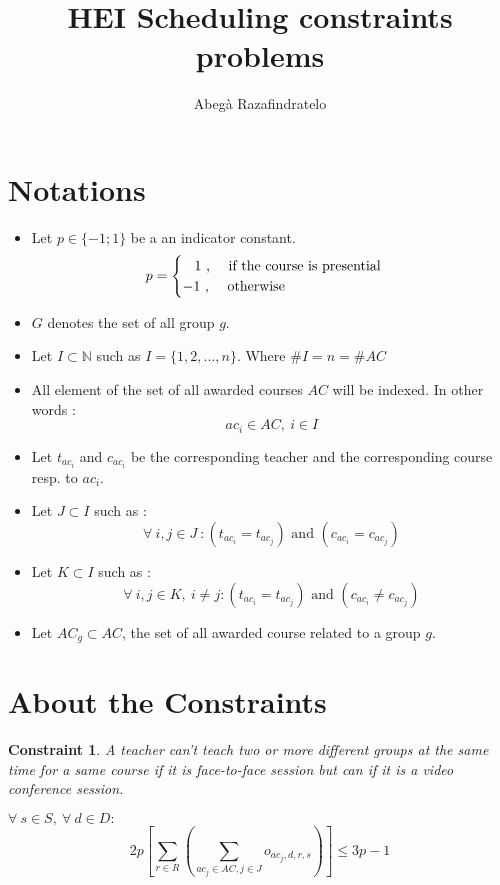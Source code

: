 \documentclass[12pt,a4paper]{article}
\author{Abegà Razafindratelo}
\title{HEI Scheduling constraints problems}
\newtheorem{theorem}{Constraint}
\begin{document}
\maketitle
\section*{Notations}
\begin{itemize}
	\item Let $p \in \{-1;1\} $ be a an indicator constant.
	$$
	p = 
	\begin{cases}
		\hspace{0.3cm} 1 \text{ , \quad if the course is presential} \\
		-1 \text{ , \quad otherwise}
	\end{cases} 
	$$
	\item $G$ denotes the set of all group $g$.
	
	\item Let $I \subset \mathbb{N}$ such as $I = \lbrace 1, 2, ..., n \rbrace$. Where $\#I = n = \#AC$
	
	\item All element of the set of all awarded courses $AC$ will be indexed. In other words :
	$$
	 ac_{i} \in AC,\ i \in I
	$$
	
	\item Let $t_{ac_{i}}$ and $c_{ac_{i}}$ be the corresponding teacher and the corresponding course resp. to  $ac_{i}$.
	
	\item Let $J \subset I$ such as :
	$$
	\forall \ i, j \in J \ : \left(t_{ac_{i}} = t_{ac_{j}} \right) \text{ and } 
	\left(c_{ac_{i}} = c_{ac_{j}} \right)
	$$ 
	
	\item Let $K \subset I$ such as :
	$$
	\forall \ i, j \in K, \ i \neq j : \left(t_{ac_{i}} = t_{ac_{j}} \right) \text{ and } 
	\left(c_{ac_{i}} \neq c_{ac_{j}} \right)
	$$ 
	
	\item Let $AC_{g} \subset AC$, the set of all awarded course related to a group $g$.
	

\end{itemize}

\section*{About the Constraints}

\begin{theorem}
A teacher can't teach two or more different groups at the same time for a same course if it is face-to-face session but can if it is a video conference session.
\end{theorem}
$
\forall \ s \in S,\ \forall \ d \in D :
$
\begin{equation}
2p \left[ \sum_{r\in R}\left(\sum_{ac_{j} \in AC, j \in J}{o_{ac_{j}, d, r, s}}\right)\right] \leq 3p - 1
\end{equation}
\end{document}
